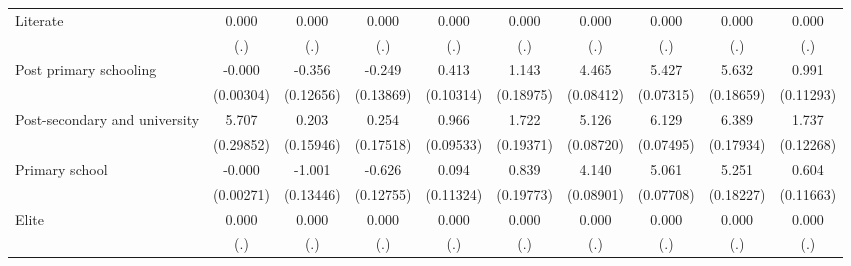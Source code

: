 {\begin{tabular}{l*{9}{c}}
Literate            &       0.000         &       0.000         &       0.000         &       0.000         &       0.000         &       0.000         &       0.000         &       0.000         &       0.000         \\
                    &         (.)         &         (.)         &         (.)         &         (.)         &         (.)         &         (.)         &         (.)         &         (.)         &         (.)         \\
Post primary schooling&      -0.000         &      -0.356\sym{**} &      -0.249         &       0.413\sym{***}&       1.143\sym{***}&       4.465\sym{***}&       5.427\sym{***}&       5.632\sym{***}&       0.991\sym{***}\\
                    &   (0.00304)         &   (0.12656)         &   (0.13869)         &   (0.10314)         &   (0.18975)         &   (0.08412)         &   (0.07315)         &   (0.18659)         &   (0.11293)         \\
Post-secondary and university&       5.707\sym{***}&       0.203         &       0.254         &       0.966\sym{***}&       1.722\sym{***}&       5.126\sym{***}&       6.129\sym{***}&       6.389\sym{***}&       1.737\sym{***}\\
                    &   (0.29852)         &   (0.15946)         &   (0.17518)         &   (0.09533)         &   (0.19371)         &   (0.08720)         &   (0.07495)         &   (0.17934)         &   (0.12268)         \\
Primary school      &      -0.000         &      -1.001\sym{***}&      -0.626\sym{***}&       0.094         &       0.839\sym{***}&       4.140\sym{***}&       5.061\sym{***}&       5.251\sym{***}&       0.604\sym{***}\\
                    &   (0.00271)         &   (0.13446)         &   (0.12755)         &   (0.11324)         &   (0.19773)         &   (0.08901)         &   (0.07708)         &   (0.18227)         &   (0.11663)         \\
Elite               &       0.000         &       0.000         &       0.000         &       0.000         &       0.000         &       0.000         &       0.000         &       0.000         &       0.000         \\
                    &         (.)         &         (.)         &         (.)         &         (.)         &         (.)         &         (.)         &         (.)         &         (.)         &         (.)         \\

\end{tabular}}
